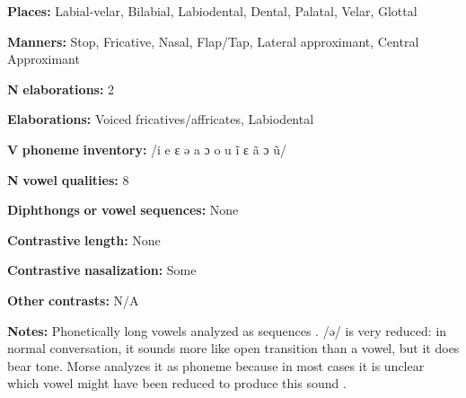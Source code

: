 \begin{styleBody}
\textbf{Places:} Labial-velar, Bilabial, Labiodental, Dental, Palatal, Velar, Glottal
\end{styleBody}

\begin{styleBody}
\textbf{Manners:} Stop, Fricative, Nasal, Flap/Tap, Lateral approximant, Central Approximant
\end{styleBody}

\begin{styleBody}
\textbf{N} \textbf{elaborations:} 2
\end{styleBody}

\begin{styleBody}
\textbf{Elaborations:} Voiced fricatives/affricates, Labiodental
\end{styleBody}

\begin{styleBody}
\textbf{V} \textbf{phoneme} \textbf{inventory:} /i e ɛ ə a ɔ o u ĩ ɛ ã ɔ ũ/
\end{styleBody}

\begin{styleBody}
\textbf{N} \textbf{vowel} \textbf{qualities:} 8
\end{styleBody}

\begin{styleBody}
\textbf{Diphthongs} \textbf{or} \textbf{vowel} \textbf{sequences:} None
\end{styleBody}

\begin{styleBody}
\textbf{Contrastive} \textbf{length:} None
\end{styleBody}

\begin{styleBody}
\textbf{Contrastive} \textbf{nasalization:} Some
\end{styleBody}

\begin{styleBody}
\textbf{Other} \textbf{contrasts:} N/A
\end{styleBody}

\begin{styleBody}
\textbf{Notes:} Phonetically long vowels analyzed as sequences \citep[100-105]{Morse1976}. /ə/ is very reduced: in normal conversation, it sounds more like open transition than a vowel, but it does bear tone. Morse analyzes it as phoneme because in most cases it is unclear which vowel might have been reduced to produce this sound \citep[42-5]{Morse1976}.
\end{styleBody}

